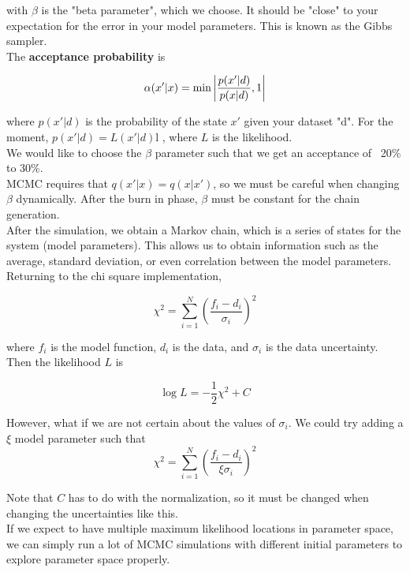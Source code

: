 \documentclass[]{article}
\begin{document}
with $\beta$ is the "beta parameter", which we choose. It should be "close" to your expectation for the error in your model parameters. This is known as the Gibbs sampler.\\

The \textbf{acceptance probability} is 

\[\alpha(x'|x) = \min{\abs{\frac{p(x'|d)}{p(x|d)}, 1}}\] 

where $p(x'|d)$ is the probability of the state $x'$ given your dataset "d". For the moment, $p(x'|d) = L(x'|d)$l , where $L$ is the likelihood.\\


We would like to choose the $\beta$ parameter such that we get an acceptance of ~20\% to 30\%.\\

MCMC requires that $q(x'|x) = q(x|x')$, so we must be careful when changing $\beta$ dynamically. After the burn in phase, $\beta$ must be constant for the chain generation.\\

After the simulation, we obtain a Markov chain, which is a series of states for the system (model parameters). This allows us to obtain information such as the average, standard deviation, or even correlation between the model parameters.\\

Returning to the chi square implementation,

\[\chi^2 = \sum_{i = 1}^{N} \left(\frac{f_i - d_i}{\sigma_i}\right)^2\]

where $f_i$ is the model function, $d_i$ is the data, and $\sigma_i$ is the data uncertainty. Then the likelihood $L$ is 

\[\log L = -\frac{1}{2}\chi^2 + C\]

However, what if we are not certain about the values of $\sigma_i$. We could try adding a $\xi$ model parameter such that \\ 

\[\chi^2 = \sum_{i = 1}^{N} \left(\frac{f_i - d_i}{\xi \sigma_i}\right)^2\]

Note that $C$ has to do with the normalization, so it must be changed when changing the uncertainties like this.\\

If we expect to have multiple maximum likelihood locations in parameter space, we can simply run a lot of MCMC simulations with different initial parameters to explore parameter space properly.\\
\end{document}
